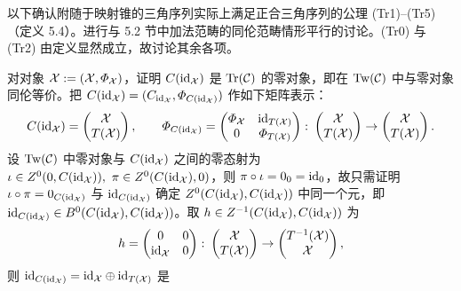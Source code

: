以下确认附随于映射锥的三角序列实际上满足正合三角序列的公理 (Tr1)–(Tr5)（定义 5.4）。进行与 5.2 节中加法范畴的同伦范畴情形平行的讨论。(Tr0) 与 (Tr2) 由定义显然成立，故讨论其余各项。

 对对象 $\mathcal{X} := (\mathcal{X},\varPhi_{\mathcal{X}})$，证明 $C(\mathrm{id}_{\mathcal{X}})$ 是 $\operatorname{Tr}(\mathcal{C})$ 的零对象，即在 $\mathrm{Tw}(\mathcal{C})$ 中与零对象同伦等价。把 $C(\mathrm{id}_{\mathcal{X}}) = (C_{\mathrm{id}_{\mathcal{X}}}, \varPhi_{C(\mathrm{id}_{\mathcal{X}})})$ 作如下矩阵表示：
\[
  C(\mathrm{id}_{\mathcal{X}}) = \begin{pmatrix}\mathcal{X}\\ T(\mathcal{X})\end{pmatrix},
  \qquad
  \varPhi_{C(\mathrm{id}_{\mathcal{X}})} = \begin{pmatrix}\varPhi_{\mathcal{X}} & \mathrm{id}_{T(\mathcal{X})}\\ 0 & \varPhi_{T(\mathcal{X})}\end{pmatrix}
  \colon \begin{pmatrix}\mathcal{X}\\ T(\mathcal{X})\end{pmatrix} \to \begin{pmatrix}\mathcal{X}\\ T(\mathcal{X})\end{pmatrix}.
\]
设 $\mathrm{Tw}(\mathcal{C})$ 中零对象与 $C(\mathrm{id}_{\mathcal{X}})$ 之间的零态射为 $\iota \in Z^{0}(0,C(\mathrm{id}_{\mathcal{X}})),\ \pi \in Z^{0}(C(\mathrm{id}_{\mathcal{X}}),0)$，则 $\pi\circ\iota = 0_{0} = \mathrm{id}_{0}$，故只需证明 $\iota\circ\pi = 0_{C(\mathrm{id}_{\mathcal{X}})}$ 与 $\mathrm{id}_{C(\mathrm{id}_{\mathcal{X}})}$ 确定 $Z^{0}(C(\mathrm{id}_{\mathcal{X}}),C(\mathrm{id}_{\mathcal{X}}))$ 中同一个元，即 $\mathrm{id}_{C(\mathrm{id}_{\mathcal{X}})} \in B^{0}(C(\mathrm{id}_{\mathcal{X}}),C(\mathrm{id}_{\mathcal{X}}))$。取 $h \in Z^{-1}(C(\mathrm{id}_{\mathcal{X}}),C(\mathrm{id}_{\mathcal{X}}))$ 为
\[
  h = \begin{pmatrix}0 & 0\\ \mathrm{id}_{\mathcal{X}} & 0\end{pmatrix}
  \colon \begin{pmatrix}\mathcal{X}\\ T(\mathcal{X})\end{pmatrix} \to \begin{pmatrix}T^{-1}(\mathcal{X})\\ \mathcal{X}\end{pmatrix},
\]
则 $\mathrm{id}_{C(\mathrm{id}_{\mathcal{X}})} = \mathrm{id}_{\mathcal{X}}\oplus\mathrm{id}_{T(\mathcal{X})}$ 是

